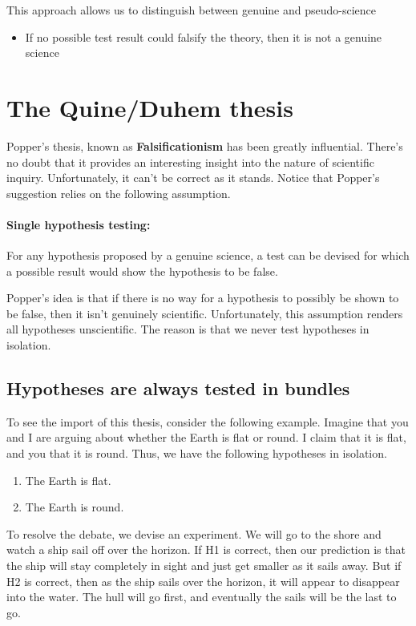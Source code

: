 \documentclass[10pt]{article}
\begin{document}
This approach allows us to distinguish between genuine and pseudo-science
\begin{itemize}
 \item If no possible test result could falsify the theory, then it is not a genuine science
\end{itemize}


\section{The Quine/Duhem thesis}
Popper's thesis, known as \textbf{Falsificationism} has been greatly influential.  There's no doubt that it provides an interesting insight into the nature of scientific inquiry. Unfortunately, it can't be correct as it stands.  Notice that Popper's suggestion relies on the following assumption.

\paragraph{Single hypothesis testing:} For any hypothesis proposed by a genuine science, a test can be devised for which a possible result would show the hypothesis to be false.

Popper's idea is that if there is no way for a hypothesis to possibly be shown to be false, then it isn't genuinely scientific.  Unfortunately, this assumption renders all hypotheses unscientific.  The reason is that we never test hypotheses in isolation.

\subsection{Hypotheses are always tested in bundles}

To see the import of this thesis, consider the following example.  Imagine that you and I are arguing about whether the Earth is flat or round.  I claim that it is flat, and you that it is round.  Thus, we have the following hypotheses in isolation.

\begin{enumerate}[(H1)]
 \item The Earth is flat.
 \item The Earth is round.
\end{enumerate}

To resolve the debate, we devise an experiment.  We will go to the shore and watch a ship sail off over the horizon.  If H1 is correct, then our prediction is that the ship will stay completely in sight and just get smaller as it sails away.  But if H2 is correct, then as the ship sails over the horizon, it will appear to disappear into the water.  The hull will go first, and eventually the sails will be the last to go.
\end{document}
